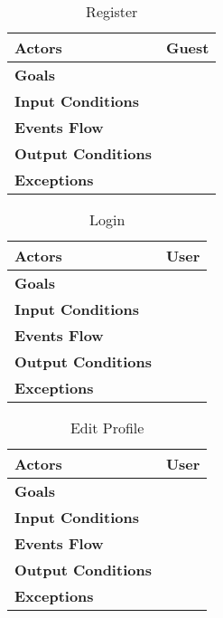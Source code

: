 

\begin{table}[H]
	\centering
	\def\arraystretch{1.5}
	\begin{tabular}{|p{7cm}|p{7cm}|}
		\hline
		\textbf{Actors}            & Guest		    \\ \hline
		\textbf{Goals}             &            \\ \hline
		\textbf{Input Conditions}  &            \\ \hline
		\textbf{Events Flow}       &            \\ \hline
		\textbf{Output Conditions} &            \\ \hline
		\textbf{Exceptions}        &            \\ \hline
	\end{tabular}
	\caption{Register}
\end{table}

\begin{table}[H]
	\centering
	\def\arraystretch{1.5}
	\begin{tabular}{|p{7cm}|p{7cm}|}
		\hline
		\textbf{Actors}            & User		    \\ \hline
		\textbf{Goals}             &            \\ \hline
		\textbf{Input Conditions}  &            \\ \hline
		\textbf{Events Flow}       &            \\ \hline
		\textbf{Output Conditions} &            \\ \hline
		\textbf{Exceptions}        &            \\ \hline
	\end{tabular}
	\caption{Login}
\end{table}

\begin{table}[H]
	\centering
	\def\arraystretch{1.5}
	\begin{tabular}{|p{7cm}|p{7cm}|}
		\hline
		\textbf{Actors}            & User		    \\ \hline
		\textbf{Goals}             &            \\ \hline
		\textbf{Input Conditions}  &            \\ \hline
		\textbf{Events Flow}       &            \\ \hline
		\textbf{Output Conditions} &            \\ \hline
		\textbf{Exceptions}        &            \\ \hline
	\end{tabular}
	\caption{Edit Profile}
\end{table}

